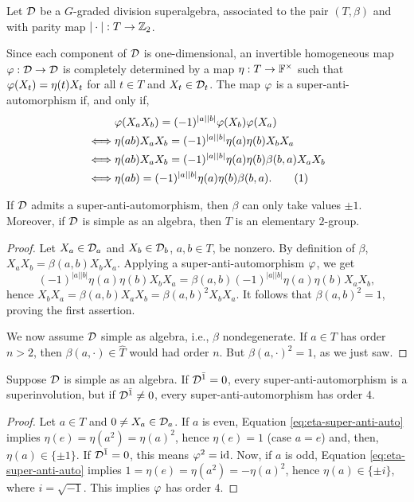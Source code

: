 \documentclass{amsbook}
\newcommand\numberthis{\addtocounter{equation}{1}\tag{\theequation}}
\begin{document}
Let $\mathcal{D}$ be a $G$-graded division superalgebra, associated to the pair $(T, \beta)$ and with parity map $| \cdot |: T \to \mathbb{Z}_2$.

Since each component of $\mathcal{D}$ is one-dimensional, an invertible homogeneous map $\varphi: \mathcal{D} \to \mathcal{D}$ is completely determined by a map $\eta: T \to \mathbb{F}^\times$ such that $\varphi(X_t) = \eta(t) X_t$ for all $t\in T$ and $X_t\in \mathcal{D}_t$.
The map $\varphi$ is a super-anti-automorphism if, and only if,
%
\begin{align*}
    &\vphi(X_a X_b) = (-1)^{|a||b|} \vphi(X_b) \vphi(X_a)\\ \iff& \eta(ab)X_a X_b = (-1)^{|a||b|} \eta(a) \eta(b) X_b X_a\\ \iff& \eta(ab)X_a X_b = (-1)^{|a||b|} \eta(a) \eta(b) \beta(b,a) X_a X_b\\ \iff& \eta(ab) = (-1)^{|a||b|} \eta(a) \eta(b) \beta(b,a). \numberthis \label{eq:eta-super-anti-auto}
\end{align*}

\begin{prop}
    If $\mathcal{D}$ admits a super-anti-automorphism, then $\beta$ can only take values $\pm 1$.
    Moreover, if $\mathcal{D}$ is simple as an algebra, then $T$ is an elementary $2$-group.
\end{prop}

\begin{proof}
    Let $X_a\in \mathcal{D}_a$ and $X_b\in \mathcal{D}_b$, $a,b\in T$, be nonzero.
    By definition of $\beta$, $X_a X_b = \beta(a,b) X_b X_a$.
    Applying a super-anti-automorphism $\varphi$, we get \[(-1)^{|a||b|} \eta(a) \eta(b) X_b X_a = \beta(a,b) (-1)^{|a||b|} \eta(a) \eta(b) X_a X_b,\] hence $X_b X_a = \beta(a,b) X_a X_b = \beta(a,b)^2 X_b X_a$.
    It follows that $\beta(a,b)^2 = 1$, proving the first assertion.
    
    We now assume $\mathcal{D}$ simple as algebra, i.e., $\beta$ nondegenerate.
    If $a\in T$ has order $n>2$, then $\beta(a, \cdot)\in \widehat T$ would had order $n$.
    But $\beta(a, \cdot )^2 =1$, as we just saw.
\end{proof}

\begin{cor}\label{cor:super-anti-order-4}
    Suppose $\mathcal{D}$ is simple as an algebra.
    If $\mathcal{D}^{\bar1} = 0$, every super-anti-automorphism is a superinvolution, but if $\mathcal{D}^{\bar1} \neq 0$, every super-anti-automorphism has order $4$.
\end{cor}

\begin{proof}
    Let $a\in T$ and $0 \neq X_a \in \mathcal{D}_a$. If $a$ is even, Equation \eqref{eq:eta-super-anti-auto} implies $\eta(e) = \eta (a^2) = \eta(a)^2$, hence $\eta(e) = 1$ (case $a=e$) and, then,  $\eta(a) \in \{ \pm 1 \}$. If $\mathcal{D}^{\bar1} = 0$, this means $\varphi^2 = \operatorname{id}$. Now, if $a$ is odd, Equation \eqref{eq:eta-super-anti-auto} implies $1 = \eta(e) = \eta (a^2) = - \eta(a)^2$, hence $\eta(a) \in \{ \pm i \}$, where $i = \sqrt{-1}$. This implies $\varphi$ has order $4$.
\end{proof}
\end{document}
